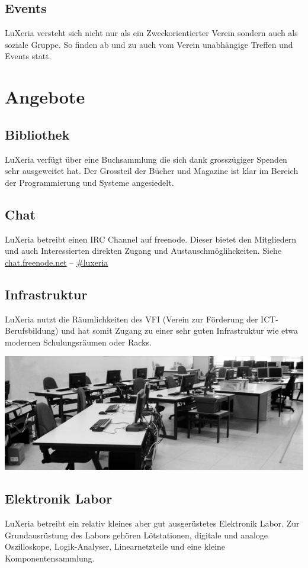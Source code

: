 \documentclass[10pt,foldmark,notumble]{leaflet}
\begin{document}
\subsection{Events}
LuXeria versteht sich nicht nur als ein Zweckorientierter 
Verein sondern auch als soziale Gruppe. So finden ab und
zu auch vom Verein unabhängige Treffen und Events statt.

\section{Angebote}
\subsection{Bibliothek}
LuXeria verfügt über eine Buchsammlung die sich dank 
grosszügiger Spenden sehr ausgeweitet hat.
Der Grossteil der Bücher und Magazine ist klar im
Bereich der Programmierung und Systeme angesiedelt.

\subsection{Chat}
LuXeria betreibt einen IRC Channel auf freenode. Dieser
bietet den Mitgliedern und auch Interessierten direkten
Zugang und Austauschmöglihckeiten. Siehe
\url{chat.freenode.net} -- \url{#luxeria}

\subsection{Infrastruktur}
LuXeria nutzt die Räumlichkeiten des VFI (Verein zur 
Förderung der ICT-Berufsbildung) und hat somit Zugang 
zu einer sehr guten Infrastruktur wie etwa modernen
Schulungsräumen oder Racks.

\includegraphics[width=1\textwidth]{kursraum.jpg}

\subsection{Elektronik Labor}
LuXeria betreibt ein relativ kleines aber gut
ausgerüstetes Elektronik Labor. Zur Grundausrüstung 
des Labors gehören Lötstationen, digitale und analoge
Oszilloskope, Logik-Analyser, Linearnetzteile und eine
kleine Komponentensammlung.
\end{document}
